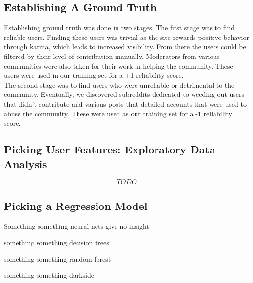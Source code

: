\subsection{Establishing A Ground Truth} %
\label{sub:establishing_a_ground_truth}
Establishing ground truth was done in two stages. The first stage was to find
reliable users. Finding these users was trivial as the site rewards positive behavior
through karma, which leads to increased visibility. From there the users could
be filtered by their level of contribution manually. Moderators from various
communities were also taken for their work in helping the community. These users
were used in our training set for a +1 reliability score. \\
The second stage was to find users who were unreliable or detrimental to the community.
Eventually, we discovered subreddits dedicated to weeding out users that didn't
contribute and various posts that detailed accounts that were used to abuse the
community. These were used as our training set for a -1 reliability score.


\subsection{Picking User Features: Exploratory Data Analysis} %
\label{sub:picking_user_features}

\[ TODO \]




\subsection{Picking a Regression Model} %
\label{sub:picking_a_regression_model}

Something something neural nets give no insight

something something decision trees

something something random forest

something something darkside

